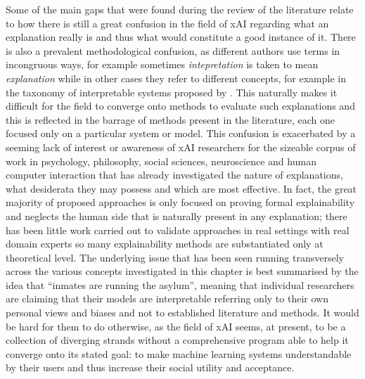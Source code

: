 Some of the main gaps that were found during the review of the literature relate to how there is still a great confusion in the field of xAI regarding what an explanation really is and thus what would constitute a good instance of it.
There is also a prevalent methodological confusion, as different authors use terms in incongruous ways, for example sometimes \textit{intepretation} is taken to mean \textit{explanation} while in other cases they refer to different concepts, for example in the taxonomy of interpretable systems proposed by \citet{doshi2017towards}.
This naturally makes it difficult for the field to converge onto methods to evaluate such explanations and this is reflected in the barrage of methods present in the literature, each one focused only on a particular system or model.
This confusion is exacerbated by a seeming lack of interest or awareness of xAI researchers for the sizeable corpus of work in psychology, philosophy, social sciences, neuroscience and human computer interaction that has already investigated the nature of explanations, what desiderata they may possess and which are most effective.
In fact, the great majority of proposed approaches is only focused on proving formal explainability and neglects the human side that is naturally present in any explanation; there has been little work carried out to validate approaches in real settings with real domain experts so many explainability methods are substantiated only at theoretical level.
The underlying issue that has been seen running transversely across the various concepts investigated in this chapter is best summarised by the idea that \enquote{inmates are running the asylum}, meaning that individual researchers are claiming that their models are interpretable referring only to their own personal views and biases and not to established literature and methods.
It would be hard for them to do otherwise, as the field of xAI seems, at present, to be a collection of diverging strands without a comprehensive program able to help it converge onto its stated goal: to make machine learning systems understandable by their users and thus increase their social utility and acceptance.